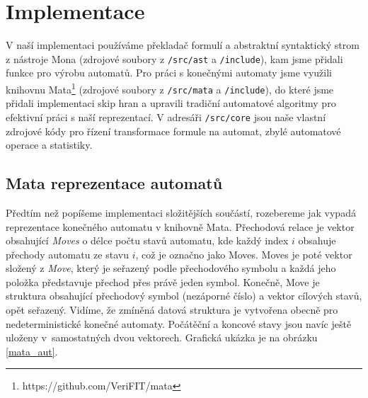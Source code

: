 \chapter{Implementace}
\label{3_implementace}

V naší implementaci používáme překladač formulí a abstraktní syntaktický strom z nástroje Mona (zdrojové soubory z \texttt{/src/ast} a \texttt{/include}), kam jsme přidali funkce pro výrobu automatů. Pro práci s konečnými automaty jsme využili knihovnu Mata\footnote{https://github.com/VeriFIT/mata} (zdrojové soubory z \texttt{/src/mata} a \texttt{/include}), do které jsme přidali implementaci skip hran a upravili tradiční automatové algoritmy pro efektivní práci s naší reprezentací. V adresáři \texttt{/src/core} jsou naše vlastní zdrojové kódy pro řízení transformace formule na automat, zbylé automatové operace a statistiky.

\section{Mata reprezentace automatů}

Předtím než popíšeme implementaci složitějších součástí, rozebereme jak vypadá reprezentace konečného automatu v knihovně Mata. Přechodová relace je vektor obsahující \textit{Moves} o délce počtu stavů automatu, kde každý index $i$ obsahuje přechody automatu ze stavu $i$, což je označno jako Moves. Moves je poté vektor složený z \textit{Move}, který je seřazený podle přechodového symbolu a každá jeho položka představuje přechod přes právě jeden symbol. Konečně, Move je struktura obsahující přechodový symbol (nezáporné číslo) a vektor cílových stavů, opět seřazený. Vidíme, že zmíněná datová struktura je vytvořena obecně pro nedeterministické konečné automaty. Počátěční a koncové stavy jsou navíc ještě uloženy v~samostatných dvou vektorech. Grafická ukázka je na obrázku \ref{mata_aut}.

